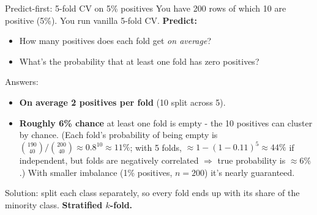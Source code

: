 \documentclass[aspectratio=169]{beamer}
\begin{document}
\begin{frame}{Predict-first: 5-fold CV on 5\% positives}
  You have 200 rows of which 10 are positive (5\%). You run vanilla 5-fold CV.
  \vfill
  \pause
  \textbf{Predict:}
  \begin{itemize}
    \item How many positives does each fold get \emph{on average}?
    \item What's the probability that at least one fold has zero positives?
  \end{itemize}
  \pause
  \vfill
  Answers:
  \begin{itemize}
    \item \textbf{On average 2 positives per fold} (10 split across 5).
    \item \textbf{Roughly 6\% chance} at least one fold is empty - the 10 positives can cluster by chance. (Each fold's probability of being empty is $\binom{190}{40}/\binom{200}{40} \approx 0.8^{10} \approx 11\%$; with 5 folds, $\approx 1 - (1 - 0.11)^5 \approx 44\%$ if independent, but folds are negatively correlated $\Rightarrow$ true probability is $\approx 6\%$.) With smaller imbalance (1\% positives, $n=200$) it's nearly guaranteed.
  \end{itemize}
  \vfill
  Solution: split each class separately, so every fold ends up with its share of the minority class. \textbf{Stratified $k$-fold.}
\end{frame}
\end{document}
